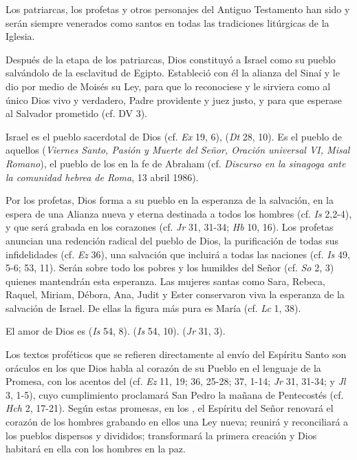 \begin{ccebody}
 Los patriarcas, los profetas y otros personajes del Antiguo Testamento han sido y serán siempre venerados como santos en todas las tradiciones litúrgicas de la Iglesia.


 Después de la etapa de los patriarcas, Dios constituyó a Israel como su pueblo salvándolo de la esclavitud de Egipto. Estableció con él la alianza del Sinaí y le dio por medio de Moisés su Ley, para que lo reconociese y le sirviera como al único Dios vivo y verdadero, Padre providente y juez justo, y para que esperase al Salvador prometido (cf. DV 3).

 Israel es el pueblo sacerdotal de Dios (cf. \textit{Ex} 19, 6),  (\textit{Dt} 28, 10). Es el pueblo de aquellos  (\textit{Viernes Santo, Pasión y Muerte del Señor, Oración universal VI, Misal Romano}), el pueblo de los  en la fe de Abraham (cf. \textit{Discurso en la sinagoga ante la comunidad hebrea de Roma}, 13 abril 1986).

 Por los profetas, Dios forma a su pueblo en la esperanza de la salvación, en la espera de una Alianza nueva y eterna destinada a todos los hombres (cf. \textit{Is} 2,2-4), y que será grabada en los corazones (cf. \textit{Jr} 31, 31-34; \textit{Hb} 10, 16). Los profetas anuncian una redención radical del pueblo de Dios, la purificación de todas sus infidelidades (cf. \textit{Ez} 36), una salvación que incluirá a todas las naciones (cf. \textit{Is} 49, 5-6; 53, 11). Serán sobre todo los pobres y los humildes del Señor (cf. \textit{So} 2, 3) quienes mantendrán esta esperanza. Las mujeres santas como Sara, Rebeca, Raquel, Miriam, Débora, Ana, Judit y Ester conservaron viva la esperanza de la salvación de Israel. De ellas la figura más pura es María (cf. \textit{Lc} 1, 38).

 El amor de Dios es  (\textit{Is} 54, 8).  (\textit{Is} 54, 10).  (\textit{Jr} 31, 3).

 Los textos proféticos que se refieren directamente al envío del Espíritu Santo son oráculos en los que Dios habla al corazón de su Pueblo en el lenguaje de la Promesa, con los acentos del  (cf. \textit{Ez }11, 19; 36, 25-28; 37, 1-14; \textit{Jr} 31, 31-34; y \textit{Jl} 3, 1-5), cuyo cumplimiento proclamará San Pedro la mañana de Pentecostés (cf. \textit{Hch} 2, 17-21). Según estas promesas, en los , el Espíritu del Señor renovará el corazón de los hombres grabando en ellos una Ley nueva; reunirá y reconciliará a los pueblos dispersos y divididos; transformará la primera creación y Dios habitará en ella con los hombres en la paz.


\end{ccebody}
